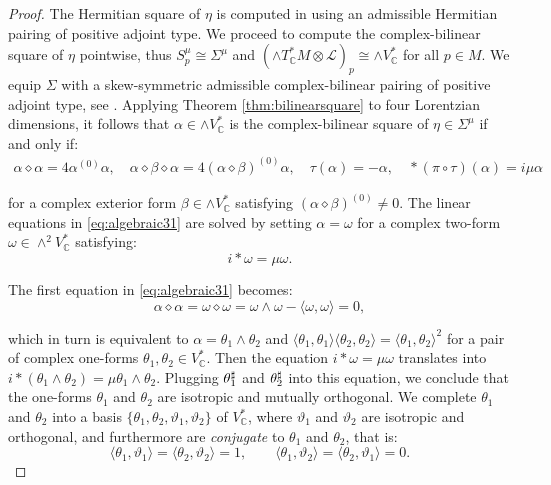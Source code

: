 \documentclass[10pt,a4paper,twoside,reqno]{amsart}
\theoremstyle{plain}
\theoremstyle{definition}
\theoremstyle{remark}
\def\C{\mathbb{C}}
\def\cL{\mathcal{L}}
\newcommand{\escal}[1]{\langle#1\rangle}
\begin{document}
\begin{proof}
The Hermitian square of $\eta$ is computed in \cite[Prop.\ 3.26]{Algebraic_Complex_Square_2025} using an admissible Hermitian pairing of positive adjoint type. We proceed to compute the complex-bilinear square of $\eta$ pointwise, thus $S^\mu_p\cong\Sigma^\mu$ and $(\wedge T^*_\C M\otimes\cL)_p\cong\wedge V^*_\C$ for all $p\in M$. We equip $\Sigma$ with a skew-symmetric admissible complex-bilinear pairing of positive adjoint type, see \cite[Prop.\ 3.18 and Table 3]{Algebraic_Complex_Square_2025}. Applying Theorem \ref{thm:bilinearsquare} to four Lorentzian dimensions, it follows that $\alpha\in\wedge V^*_\C$ is the complex-bilinear square of $\eta \in \Sigma^\mu$ if and only if:
\begin{eqnarray}
\label{eq:algebraic31}
\alpha\diamond\alpha = 4 \alpha^{(0)}\alpha,\quad \alpha \diamond \beta \diamond \alpha = 4(\alpha\diamond\beta)^{(0)}\alpha,\quad \tau(\alpha) = -\alpha , \quad  \ast (\pi\circ\tau)(\alpha) = i\mu \alpha
\end{eqnarray}

for a complex exterior form $\beta\in\wedge V^*_\C$ satisfying $(\alpha\diamond\beta)^{(0)} \neq 0$. The linear equations in \eqref{eq:algebraic31} are solved by setting $\alpha = \omega$ for a complex two-form $\omega\in\wedge^2V^*_\C$ satisfying:
\begin{equation*}
i\ast \omega =  \mu \omega.
\end{equation*}

The first equation in \eqref{eq:algebraic31} becomes:
\begin{equation*}
\alpha\diamond\alpha=\omega\diamond\omega=\omega\wedge\omega-\escal{\omega,\omega}=0,
\end{equation*}

which in turn is equivalent to $\alpha = \theta_1\wedge \theta_2$ and $\escal{\theta_1,\theta_1}\escal{\theta_2,\theta_2}=\escal{\theta_1,\theta_2}^2$ for a pair of complex one-forms $\theta_1 , \theta_2 \in V^*_\C$. Then the equation $i*\omega=\mu\omega$ translates into $i*(\theta_1\wedge\theta_2)=\mu\theta_1\wedge\theta_2$. Plugging $\theta_1^{\smash{\sharp}}$ and $\theta_2^{\smash{\sharp}}$ into this equation, we conclude that the one-forms $\theta_1$ and $\theta_2$ are isotropic and mutually orthogonal. We complete $\theta_1$ and $\theta_2$ into a basis $\{\theta_1,\theta_2,\vartheta_1,\vartheta_2\}$ of $V^*_\C$, where $\vartheta_1$ and $\vartheta_2$ are isotropic and orthogonal, and furthermore are \emph{conjugate} to $\theta_1$ and $\theta_2$, that is:
\begin{equation*}
\escal{\theta_1,\vartheta_1}=\escal{\theta_2,\vartheta_2}=1,\qquad \escal{\theta_1,\vartheta_2}=\escal{\theta_2,\vartheta_1}=0.
\end{equation*}


\end{proof}
\end{document}
